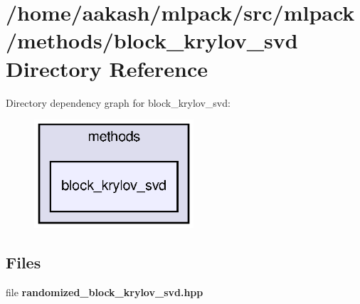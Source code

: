 \section{/home/aakash/mlpack/src/mlpack/methods/block\+\_\+krylov\+\_\+svd Directory Reference}
\label{dir_3cfeb8d9aa9b18d60fef1e3116a79aa8}
Directory dependency graph for block\+\_\+krylov\+\_\+svd\+:
\nopagebreak
\begin{figure}[H]
\begin{center}
\leavevmode
\includegraphics[width=168pt]{dir_3cfeb8d9aa9b18d60fef1e3116a79aa8_dep}
\end{center}
\end{figure}
\subsection*{Files}
\begin{DoxyCompactItemize}
\item 
file \textbf{ randomized\+\_\+block\+\_\+krylov\+\_\+svd.\+hpp}
\end{DoxyCompactItemize}
